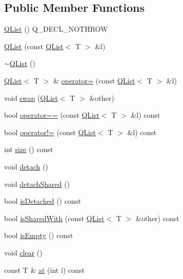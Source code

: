\subsection*{Public Member Functions}
\begin{DoxyCompactItemize}
\item 
\hyperlink{class_q_list_a74043360170a66953054a21e9661e274}{Q\+List} () Q\+\_\+\+D\+E\+C\+L\+\_\+\+N\+O\+T\+H\+R\+OW
\item 
\hyperlink{class_q_list_a43794b89e15c6c36bd2ae2054c4f8de2}{Q\+List} (const \hyperlink{class_q_list}{Q\+List}$<$ T $>$ \&l)
\item 
\hyperlink{class_q_list_a0c359563cd4585ffeab2d71e7f523811}{$\sim$\+Q\+List} ()
\item 
\hyperlink{class_q_list}{Q\+List}$<$ T $>$ \& \hyperlink{class_q_list_af210d61c252a7f0124854a9fea8fc23d}{operator=} (const \hyperlink{class_q_list}{Q\+List}$<$ T $>$ \&l)
\item 
void \hyperlink{class_q_list_a0db2f46bd41dd9ce5553f0be73825eb6}{swap} (\hyperlink{class_q_list}{Q\+List}$<$ T $>$ \&other)
\item 
bool \hyperlink{class_q_list_a5de7da6896f7bd2a446dbdaab6466c0f}{operator==} (const \hyperlink{class_q_list}{Q\+List}$<$ T $>$ \&l) const 
\item 
bool \hyperlink{class_q_list_ad3d2c51aa92fbff38a7dfe5ad8e6b1e7}{operator!=} (const \hyperlink{class_q_list}{Q\+List}$<$ T $>$ \&l) const 
\item 
int \hyperlink{class_q_list_a2ee18cf0bec5e1d0951a1ca1ccfb93fe}{size} () const 
\item 
void \hyperlink{class_q_list_a522859faa6db19022d44dd799078c199}{detach} ()
\item 
void \hyperlink{class_q_list_af112ea5d3c4200a720e248dffc39c4cc}{detach\+Shared} ()
\item 
bool \hyperlink{class_q_list_aa130852a9913d0d152900acbf142f81c}{is\+Detached} () const 
\item 
bool \hyperlink{class_q_list_ae89d314b75b59e294eed8597202ca74e}{is\+Shared\+With} (const \hyperlink{class_q_list}{Q\+List}$<$ T $>$ \&other) const 
\item 
bool \hyperlink{class_q_list_a7425e13d514dd7adc3cf210679eea5c3}{is\+Empty} () const 
\item 
void \hyperlink{class_q_list_a19c0e32852df02f13bd2a4dd3d637f04}{clear} ()
\item 
const T \& \hyperlink{class_q_list_a0cc68a58145ae69d679da558f4d5e849}{at} (int i) const 
\item 

\end{DoxyCompactItemize}

